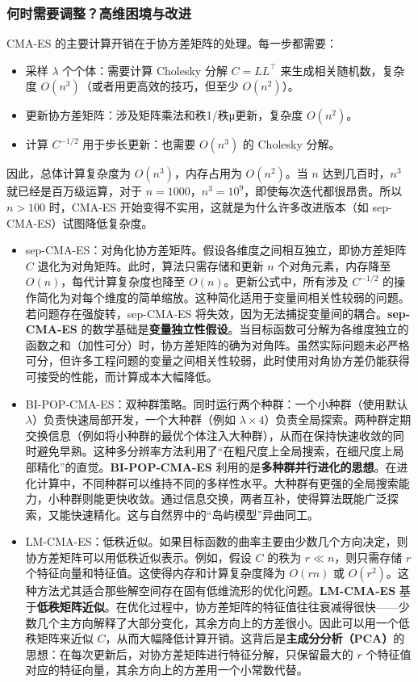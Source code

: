 \documentclass[lang=cn,zihao=-4,a4paper,fontset=windows]{beautybook}
\begin{document}
\subsubsection{何时需要调整？高维困境与改进}

CMA-ES 的主要计算开销在于协方差矩阵的处理。每一步都需要：
\begin{itemize}
    \item 采样 $\lambda$ 个个体：需要计算 Cholesky 分解 $C = LL^\top$ 来生成相关随机数，复杂度 $O(n^3)$（或者用更高效的技巧，但至少 $O(n^2)$）。
    \item 更新协方差矩阵：涉及矩阵乘法和秩1/秩μ更新，复杂度 $O(n^2)$。
    \item 计算 $C^{-1/2}$ 用于步长更新：也需要 $O(n^3)$ 的 Cholesky 分解。
\end{itemize}

因此，总体计算复杂度为 $O(n^3)$，内存占用为 $O(n^2)$。当 $n$ 达到几百时，$n^3$ 就已经是百万级运算，对于 $n=1000$，$n^3=10^9$，即使每次迭代都很昂贵。所以 $n>100$ 时，CMA-ES 开始变得不实用，这就是为什么许多改进版本（如 sep-CMA-ES）试图降低复杂度。

\begin{itemize}
\item sep-CMA-ES：对角化协方差矩阵。假设各维度之间相互独立，即协方差矩阵 $C$ 退化为对角矩阵。此时，算法只需存储和更新 $n$ 个对角元素，内存降至 $O(n)$，每代计算复杂度也降至 $O(n)$。更新公式中，所有涉及 $C^{-1/2}$ 的操作简化为对每个维度的简单缩放。这种简化适用于变量间相关性较弱的问题。若问题存在强旋转，sep-CMA-ES 将失效，因为无法捕捉变量间的耦合。\textbf{sep-CMA-ES} 的数学基础是\textbf{变量独立性假设}。当目标函数可分解为各维度独立的函数之和（加性可分）时，协方差矩阵的确为对角阵。虽然实际问题未必严格可分，但许多工程问题的变量之间相关性较弱，此时使用对角协方差仍能获得可接受的性能，而计算成本大幅降低。
\item BI-POP-CMA-ES：双种群策略。同时运行两个种群：一个小种群（使用默认 $\lambda$）负责快速局部开发，一个大种群（例如 $\lambda \times 4$）负责全局探索。两种群定期交换信息（例如将小种群的最优个体注入大种群），从而在保持快速收敛的同时避免早熟。这种多分辨率方法利用了“在粗尺度上全局搜索，在细尺度上局部精化”的直觉。\textbf{BI-POP-CMA-ES} 利用的是\textbf{多种群并行进化的思想}。在进化计算中，不同种群可以维持不同的多样性水平。大种群有更强的全局搜索能力，小种群则能更快收敛。通过信息交换，两者互补，使得算法既能广泛探索，又能快速精化。这与自然界中的“岛屿模型”异曲同工。
\item LM-CMA-ES：低秩近似。如果目标函数的曲率主要由少数几个方向决定，则协方差矩阵可以用低秩近似表示。例如，假设 $C$ 的秩为 $r \ll n$，则只需存储 $r$ 个特征向量和特征值。这使得内存和计算复杂度降为 $O(r n)$ 或 $O(r^2)$。这种方法尤其适合那些解空间存在固有低维流形的优化问题。\textbf{LM-CMA-ES} 基于\textbf{低秩矩阵近似}。在优化过程中，协方差矩阵的特征值往往衰减得很快——少数几个主方向解释了大部分变化，其余方向上的方差很小。因此可以用一个低秩矩阵来近似 $C$，从而大幅降低计算开销。这背后是\textbf{主成分分析（PCA）}的思想：在每次更新后，对协方差矩阵进行特征分解，只保留最大的 $r$ 个特征值对应的特征向量，其余方向上的方差用一个小常数代替。
\end{itemize}
\end{document}
